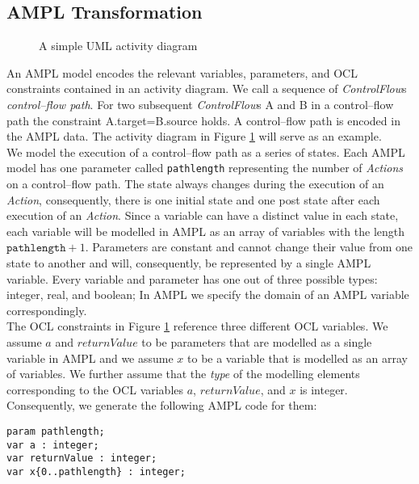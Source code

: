 \documentclass[runningheads,a4paper]{llncs}%
\newcommand{\UMLType}[1]{\textsf{\textit{#1}}} %
\newcommand{\UMLReference}[1]{\textsf{\textit{#1}}} %
\newcommand{\AMPLCode}[1]{\texttt{#1}}
\begin{document}
\subsection{AMPL Transformation}%
\label{sec:AMPLTransformation}%
\begin{figure}%
\def\svgwidth{\textwidth}%
\graphicspath{{./pics/}}%
%
\caption{A simple UML activity diagram}%
\label{fig:AssignmentDecision}%
\end{figure}%
An AMPL model encodes the relevant variables, parameters, and OCL constraints contained in an activity diagram. We call a sequence of \UMLReference{ControlFlow}s \emph{control--flow path}. For two subsequent \UMLType{ControlFlow}s A and B in a control--flow path the constraint A.target=B.source holds. A control--flow path is encoded in the AMPL data. The activity diagram in Figure \ref{fig:AssignmentDecision} will serve as an example.\\%
We model the execution of a control--flow path as a series of states. Each AMPL model has one parameter called \AMPLCode{pathlength} representing the number of \UMLType{Actions} on a control--flow path. The state always changes during the execution of an \UMLType{Action}, consequently, there is one initial state and one post state after each execution of an \UMLType{Action}. Since a variable can have a distinct value in each state, each variable will be modelled in AMPL as an array of variables with the length $\AMPLCode{pathlength}+1$. Parameters are constant and cannot change their value from one state to another and will, consequently, be represented by a single AMPL variable. Every variable and parameter has one out of three possible types: integer, real, and boolean; In AMPL we specify the domain of an AMPL variable correspondingly.\\%
The OCL constraints in Figure \ref{fig:AssignmentDecision} reference three different OCL variables. We assume $a$ and $returnValue$ to be parameters that are modelled as a single variable in AMPL and we assume $x$ to be a variable that is modelled as an array of variables. We further assume that the \UMLReference{type} of the modelling elements corresponding to the OCL variables $a$, ${returnValue}$, and $x$ is integer. Consequently, we generate the following AMPL code for them: %
\begin{lstlisting}[basicstyle=\ttfamily,language=ampl]
param pathlength;
var a : integer;
var returnValue : integer;
var x{0..pathlength} : integer;
\end{lstlisting}%
\end{document}
